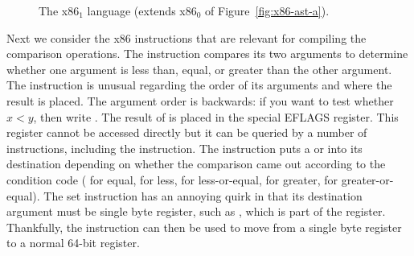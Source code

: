 \documentclass[11pt]{book}
\newcommand{\gray}[1]{{\color{lightgray} #1}}
\begin{document}
\begin{figure}[tp]
\fbox{
\begin{minipage}{0.96\textwidth}
\[
\begin{array}{lcl}
\Arg &::=&  \gray{\INT{\Int} \mid \REG{\itm{register}}
    \mid (\key{deref}\,\itm{register}\,\Int)} \\
     &\mid& (\key{byte-reg}\; \itm{register}) \\
\itm{cc} & ::= & \key{e} \mid \key{l} \mid \key{le} \mid \key{g} \mid \key{ge} \\
\Instr &::=& \gray{(\key{addq} \; \Arg\; \Arg) \mid
             (\key{subq} \; \Arg\; \Arg) \mid
             (\key{negq} \; \Arg) \mid (\key{movq} \; \Arg\; \Arg)} \\
      &\mid& \gray{(\key{callq} \; \mathit{label}) \mid
             (\key{pushq}\;\Arg) \mid
             (\key{popq}\;\Arg) \mid
             (\key{retq})} \\
       &\mid& (\key{xorq} \; \Arg\;\Arg)
       \mid (\key{cmpq} \; \Arg\; \Arg) \mid (\key{set}\;\itm{cc} \; \Arg) \\
       &\mid& (\key{movzbq}\;\Arg\;\Arg)
       \mid  (\key{jmp} \; \itm{label})
       \mid (\key{jmp-if}\; \itm{cc} \; \itm{label}) \\
       &\mid& (\key{label} \; \itm{label}) \\
x86_1 &::= & (\key{program} \;\itm{info} \;(\key{type}\;\itm{type})\; \Instr^{+})
\end{array}
\]
\end{minipage}
}
\caption{The x86$_1$ language (extends x86$_0$ of Figure~\ref{fig:x86-ast-a}).}
\label{fig:x86-1}
\end{figure}

Next we consider the x86 instructions that are relevant for
compiling the comparison operations. The  instruction
compares its two arguments to determine whether one argument is less
than, equal, or greater than the other argument. The 
instruction is unusual regarding the order of its arguments and where
the result is placed. The argument order is backwards: if you want to
test whether $x < y$, then write . The result of
 is placed in the special EFLAGS register. This register
cannot be accessed directly but it can be queried by a number of
instructions, including the  instruction. The 
instruction puts a  or  into its destination depending
on whether the comparison came out according to the condition code
 ( for equal,  for less,  for
less-or-equal,  for greater,  for greater-or-equal).
The set instruction has an annoying quirk in that its destination
argument must be single byte register, such as , which is
part of the  register.  Thankfully, the 
instruction can then be used to move from a single byte register to a
normal 64-bit register.
\end{document}
